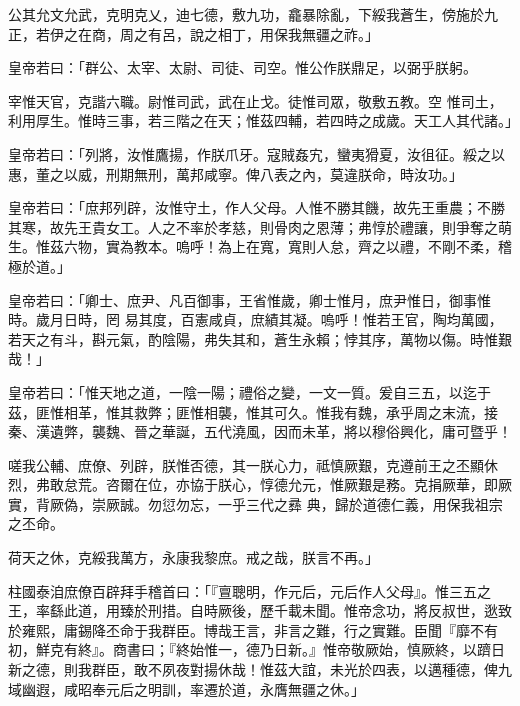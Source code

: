 \begin{pinyinscope}
 公其允文允武，克明克乂，迪七德，敷九功，龕暴除亂，下綏我蒼生，傍施於九正，若伊之在商，周之有呂，說之相丁，用保我無疆之祚。」



 皇帝若曰：「群公、太宰、太尉、司徒、司空。惟公作朕鼎足，以弼乎朕躬。



 宰惟天官，克諧六職。尉惟司武，武在止戈。徒惟司眾，敬敷五教。空
 惟司土，利用厚生。惟時三事，若三階之在天；惟茲四輔，若四時之成歲。天工人其代諸。」



 皇帝若曰：「列將，汝惟鷹揚，作朕爪牙。寇賊姦宄，蠻夷猾夏，汝徂征。綏之以惠，董之以威，刑期無刑，萬邦咸寧。俾八表之內，莫違朕命，時汝功。」



 皇帝若曰：「庶邦列辟，汝惟守土，作人父母。人惟不勝其饑，故先王重農；不勝其寒，故先王貴女工。人之不率於孝慈，則骨肉之恩薄；弗惇於禮讓，則爭奪之萌生。惟茲六物，實為教本。嗚呼！為上在寬，寬則人怠，齊之以禮，不剛不柔，稽極於道。」



 皇帝若曰：「卿士、庶尹、凡百御事，王省惟歲，卿士惟月，庶尹惟日，御事惟時。歲月日時，罔
 易其度，百憲咸貞，庶績其凝。嗚呼！惟若王官，陶均萬國，若天之有斗，斟元氣，酌陰陽，弗失其和，蒼生永賴；悖其序，萬物以傷。時惟艱哉！」



 皇帝若曰：「惟天地之道，一陰一陽；禮俗之變，一文一質。爰自三五，以迄于茲，匪惟相革，惟其救弊；匪惟相襲，惟其可久。惟我有魏，承乎周之末流，接秦、漢遺弊，襲魏、晉之華誕，五代澆風，因而未革，將以穆俗興化，庸可暨乎！



 嗟我公輔、庶僚、列辟，朕惟否德，其一朕心力，祗慎厥艱，克遵前王之丕顯休烈，弗敢怠荒。咨爾在位，亦協于朕心，惇德允元，惟厥艱是務。克捐厥華，即厥實，背厥偽，崇厥誠。勿愆勿忘，一乎三代之彞
 典，歸於道德仁義，用保我祖宗之丕命。



 荷天之休，克綏我萬方，永康我黎庶。戒之哉，朕言不再。」



 柱國泰洎庶僚百辟拜手稽首曰：「『亶聰明，作元后，元后作人父母』。惟三五之王，率繇此道，用臻於刑措。自時厥後，歷千載未聞。惟帝念功，將反叔世，逖致於雍熙，庸錫降丕命于我群臣。博哉王言，非言之難，行之實難。臣聞『靡不有初，鮮克有終』。商書曰；『終始惟一，德乃日新。』惟帝敬厥始，慎厥終，以躋日新之德，則我群臣，敢不夙夜對揚休哉！惟茲大誼，未光於四表，以邁種德，俾九域幽遐，咸昭奉元后之明訓，率遷於道，永膺無疆之休。」




\end{pinyinscope}
